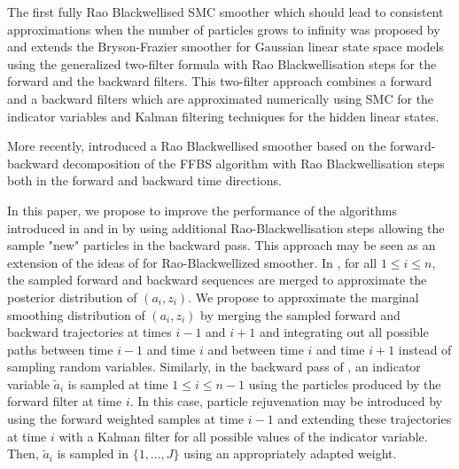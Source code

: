 The first fully Rao Blackwellised SMC smoother which should lead to consistent approximations when the number of particles grows to infinity was proposed by  \cite{briers:doucet:maskell:2010} and extends the Bryson-Frazier smoother for Gaussian linear state space models using the generalized two-filter formula with Rao Blackwellisation steps for the forward and the backward filters.  This two-filter approach combines a forward and a backward filters which are approximated numerically using SMC for the indicator variables and Kalman filtering techniques for the hidden linear states. 

More recently, \cite{lindsten:bunch:sarkka:schon:godsill:2015,sarkka:bunch:godsill:2012,lindsten:bunch:godsill:schon:2013} introduced a Rao Blackwellised smoother based on the forward-backward decomposition of the FFBS algorithm with Rao Blackwellisation steps both in the forward and backward time directions.  

In this paper, we propose to improve the performance of the algorithms introduced in \cite{briers:doucet:maskell:2010} and in \cite{lindsten:bunch:sarkka:schon:godsill:2015,sarkka:bunch:godsill:2012,lindsten:bunch:godsill:schon:2013} by using additional Rao-Blackwellisation steps allowing the sample "new" particles in the backward pass. This approach may be seen as an extension of the ideas of \cite{fearnhead:clifford:2003} for Rao-Blackwellized smoother.  In \cite{briers:doucet:maskell:2010}, for all $1\le i\le n$, the sampled forward and backward sequences are merged to approximate the posterior distribution of $(a_i,z_i)$. We propose to approximate the marginal smoothing distribution of $(a_i,z_i)$ by merging the sampled forward and backward trajectories at times $i-1$ and $i+1$ and integrating out all possible paths between time $i-1$ and time $i$ and between time $i$ and time $i+1$ instead of sampling random variables. Similarly, in the backward pass of \cite{lindsten:bunch:sarkka:schon:godsill:2015,sarkka:bunch:godsill:2012,lindsten:bunch:godsill:schon:2013}, an indicator variable $\tilde{a}_i$ is sampled at time $1\le i\le n-1$ using the particles produced by the forward filter at time $i$. In this case, particle rejuvenation may be introduced by using the forward weighted samples at time $i-1$ and extending these trajectories at time $i$ with a Kalman filter for all possible values of the indicator variable. Then, $\tilde{a}_i$ is sampled in $\{1,\ldots,J\}$ using an appropriately adapted weight.

